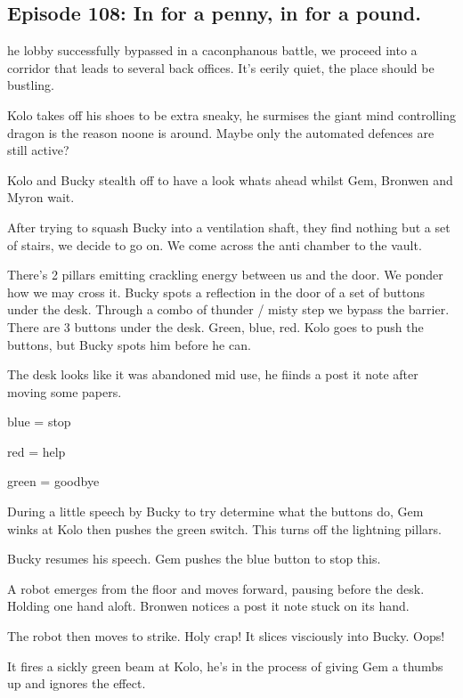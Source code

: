 \subsection{Episode 108: In for a penny, in for a pound.}

he lobby successfully bypassed in a caconphanous battle, we proceed into a corridor that leads to several back offices. It's eerily quiet, the place should be bustling.\medskip

Kolo takes off his shoes to be extra sneaky, he surmises the giant mind controlling dragon is the reason noone is around. Maybe only the automated defences are still active?\medskip

Kolo and Bucky stealth off to have a look whats ahead whilst Gem, Bronwen and Myron wait.\medskip

After trying to squash Bucky into a ventilation shaft, they find nothing but a set of stairs, we decide to go on. We come across the anti chamber to the vault.\medskip

There's 2 pillars emitting crackling energy between us and the door. We ponder how we may cross it. Bucky spots a reflection in the door of a set of buttons under the desk. Through a combo of thunder / misty step we bypass the barrier. There are 3 buttons under the desk. Green, blue, red. Kolo goes to push the buttons, but Bucky spots him before he can.\medskip

The desk looks like it was abandoned mid use, he fiinds a post it note after moving some papers.\medskip

blue = stop\medskip

red = help\medskip

green = goodbye\medskip

During a little speech by Bucky to try determine what the buttons do, Gem winks at Kolo then pushes the green switch. This turns off the lightning pillars.\medskip

Bucky resumes his speech. Gem pushes the blue button to stop this.\medskip

A robot emerges from the floor and moves forward, pausing before the desk. Holding one hand aloft. Bronwen notices a post it note stuck on its hand.\medskip

The robot then moves to strike. Holy crap! It slices visciously into Bucky. Oops!\medskip

It fires a sickly green beam at Kolo, he's in the process of giving Gem a thumbs up and ignores the effect.\medskip

